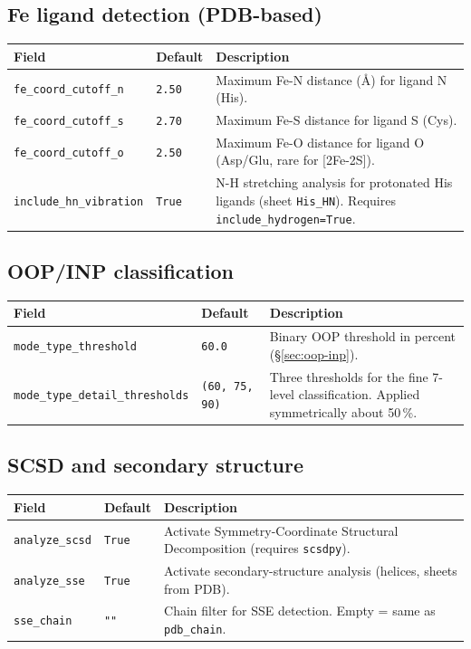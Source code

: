 \documentclass[11pt,a4paper,twoside]{article}
\theoremstyle{remark}
\begin{document}
\subsection{Fe ligand detection (PDB-based)}

\begin{longtable}{p{} p{} p{}}
\toprule
\textbf{Field} & \textbf{Default} & \textbf{Description} \\
\midrule
\endhead
\texttt{fe\_coord\_cutoff\_n} & \texttt{2.50} & Maximum Fe-N
  distance (\AA{}) for ligand N (His). \\
\texttt{fe\_coord\_cutoff\_s} & \texttt{2.70} & Maximum Fe-S
  distance for ligand S (Cys). \\
\texttt{fe\_coord\_cutoff\_o} & \texttt{2.50} & Maximum Fe-O
  distance for ligand O (Asp/Glu, rare for [2Fe-2S]). \\
\texttt{include\_hn\_vibration} & \texttt{True} & N-H stretching
  analysis for protonated His ligands (sheet \texttt{His\_HN}).
  Requires \texttt{include\_hydrogen=True}. \\
\bottomrule
\end{longtable}

\subsection{OOP/INP classification}

\begin{longtable}{p{} p{} p{}}
\toprule
\textbf{Field} & \textbf{Default} & \textbf{Description} \\
\midrule
\endhead
\texttt{mode\_type\_threshold} & \texttt{60.0} & Binary OOP
  threshold in percent (\S\ref{sec:oop-inp}). \\
\texttt{mode\_type\_detail\_thresholds} & \texttt{(60, 75, 90)}
  & Three thresholds for the fine 7-level classification.
  Applied symmetrically about 50\,\%. \\
\bottomrule
\end{longtable}

\subsection{SCSD and secondary structure}

\begin{longtable}{p{} p{} p{}}
\toprule
\textbf{Field} & \textbf{Default} & \textbf{Description} \\
\midrule
\endhead
\texttt{analyze\_scsd}  & \texttt{True} & Activate Symmetry-Coordinate
  Structural Decomposition (requires \texttt{scsdpy}). \\
\texttt{analyze\_sse}    & \texttt{True} & Activate secondary-structure
  analysis (helices, sheets from PDB). \\
\texttt{sse\_chain}      & \texttt{""}   & Chain filter for
  SSE detection. Empty = same as \texttt{pdb\_chain}. \\
\bottomrule
\end{longtable}
\end{document}
